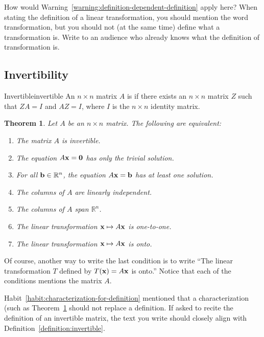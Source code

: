\documentclass{book}
\newcounter{ekcounter}%
\theoremstyle{ekimcustom}
\newtheorem{theorem}[ekcounter]{Theorem}
\newcommand\defn[1]{{\color{blue}{\bf #1}}}
\begin{document}
How would Warning~\ref{warning:definition-dependent-definition} apply here? When stating the definition of a linear transformation, you should mention the word transformation, but you should not (at the same time) define what a transformation is. Write to an audience who already knows what the definition of transformation is.

\subsection{Invertibility}

\begin{bdefinition}{Invertible}{invertible}
An $n \times n$ matrix $A$ is \defn{invertible} if there exists an $n \times n$ matrix $Z$ such that $ZA = I$ and $AZ = I$, where $I$ is the $n \times n$ identity matrix.
\end{bdefinition}

\begin{theorem}\label{theorem:invertible-matrix-theorem}
Let $A$ be an $n \times n$ matrix. The following are equivalent:
\begin{enumerate}
\item The matrix $A$ is invertible.
\item The equation $A{\bf x} = {\bf 0}$ has only the trivial solution.
\item For all ${\bf b} \in \mathbb{R}^n$, the equation $A{\bf x} = {\bf b}$ has at least one solution.
\item The columns of $A$ are linearly independent.
\item The columns of $A$ span $\mathbb{R}^n$.
\item The linear transformation ${\bf x} \mapsto A{\bf x}$ is one-to-one.
\item The linear transformation ${\bf x} \mapsto A{\bf x}$ is onto.
\end{enumerate}
\end{theorem}
Of course, another way to write the last condition is to write ``The linear transformation $T$ defined by $T({\bf x}) = A{\bf x}$ is onto.'' Notice that each of the conditions mentions the matrix $A$.

Habit~\ref{habit:characterization-for-definition} mentioned that a characterization (such as Theorem~\ref{theorem:invertible-matrix-theorem} should not replace a definition. If asked to recite the definition of an invertible matrix, the text you write should closely align with Definition~\ref{definition:invertible}.
\end{document}
